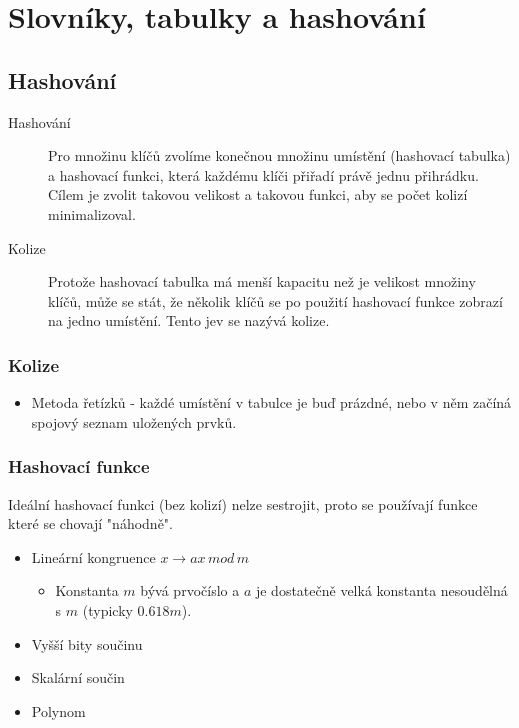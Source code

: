 \section{Slovníky, tabulky a hashování}
  \subsection{Hashování}
    \begin{description}
      \item[Hashování] Pro množinu klíčů zvolíme konečnou množinu umístění (hashovací tabulka) a hashovací funkci, která každému klíči přiřadí právě jednu přihrádku.
      Cílem je zvolit takovou velikost a takovou funkci, aby se počet kolizí minimalizoval.
      \item[Kolize] Protože hashovací tabulka má menší kapacitu než je velikost množiny klíčů, může se stát, že několik klíčů se po použití hashovací funkce zobrazí na jedno umístění.
      Tento jev se nazývá kolize.
    \end{description}

    \subsubsection{Kolize}
      \begin{itemize}
        \item Metoda řetízků - každé umístění v tabulce je buď prázdné, nebo v něm začíná spojový seznam uložených prvků.
      \end{itemize}

    \subsubsection{Hashovací funkce}
      Ideální hashovací funkci (bez kolizí) nelze sestrojit, proto se používají funkce které se chovají "náhodně".
      \begin{itemize}
        \item Lineární kongruence $x \to ax \, mod \, m$
          \begin{itemize}
            \item Konstanta $m$ bývá prvočíslo a $a$ je dostatečně velká konstanta nesoudělná s $m$ (typicky $0.618m$).
          \end{itemize}
        \item Vyšší bity součinu
        \item Skalární součin
        \item Polynom
      \end{itemize}

